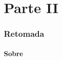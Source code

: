 \documentclass[10pt, compress]{beamer}
\begin{document}
\part{Parte II}

\maketitle

\section{Retomada}

\subsection{Sobre}
\end{document}
